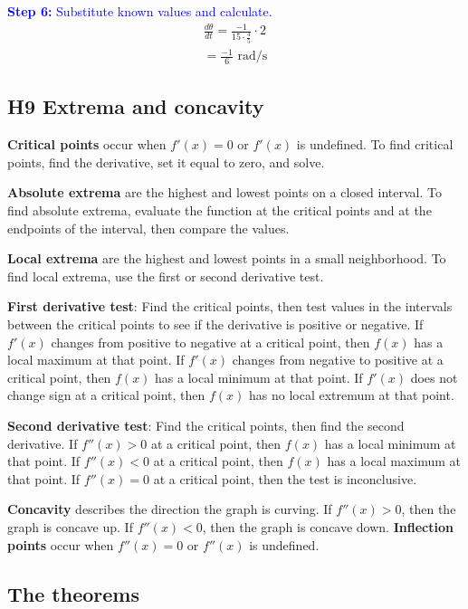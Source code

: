 \documentclass[letterpaper, 12pt]{article}
\newcommand{\step}[2]{\textcolor{blue}{\textbf{Step #1:} #2}}
\begin{document}
\step{6}{Substitute known values and calculate.}
\begin{gather*}
\frac{d\theta}{dt} = \frac{-1}{15 \cdot \frac{4}{5}} \cdot 2 \\ = \boxed{\frac{-1}{6} \text{ rad/s}}
\end{gather*}

\subsection*{H9 Extrema and concavity}

\textbf{Critical points} occur when $f'(x) = 0$ or $f'(x)$ is undefined. To find critical points, find the derivative, set it equal to zero, and solve.

\textbf{Absolute extrema} are the highest and lowest points on a closed interval. To find absolute extrema, evaluate the function at the critical points and at the endpoints of the interval, then compare the values.

\textbf{Local extrema} are the highest and lowest points in a small neighborhood. To find local extrema, use the first or second derivative test.

\textbf{First derivative test}: Find the critical points, then test values in the intervals between the critical points to see if the derivative is positive or negative. If $f'(x)$ changes from positive to negative at a critical point, then $f(x)$ has a local maximum at that point. If $f'(x)$ changes from negative to positive at a critical point, then $f(x)$ has a local minimum at that point. If $f'(x)$ does not change sign at a critical point, then $f(x)$ has no local extremum at that point.

\textbf{Second derivative test}: Find the critical points, then find the second derivative. If $f''(x) > 0$ at a critical point, then $f(x)$ has a local minimum at that point. If $f''(x) < 0$ at a critical point, then $f(x)$ has a local maximum at that point. If $f''(x) = 0$ at a critical point, then the test is inconclusive.

\textbf{Concavity} describes the direction the graph is curving. If $f''(x) > 0$, then the graph is concave up. If $f''(x) < 0$, then the graph is concave down. \textbf{Inflection points} occur when $f''(x) = 0$ or $f''(x)$ is undefined. 

\subsection*{The theorems}
\end{document}
